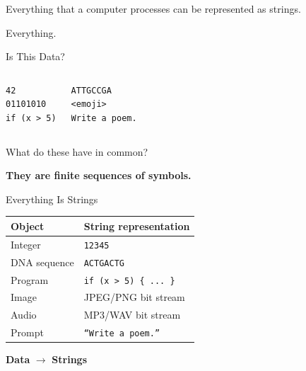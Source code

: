 \documentclass[10pt,aspectratio=169]{beamer}
\title{\CourseName}
\subtitle{\LectureTitle}
\author{Sheikh Azizul Hakim\\Lecturer, Department of CSE, BUET}
\date{Last compiled: \LastCompiledTime}
\newcommand{\keyidea}[1]{\begin{center}\alert{\textbf{#1}}\end{center}}
\begin{document}
\maketitle

\begin{frame}[standout]
Everything that a computer processes can be represented as strings.

\vspace{1em}

Everything.
\end{frame}

\begin{frame}[fragile]{Is This Data?}
\begin{columns}[T]
\begin{lstlisting}
42
01101010
if (x > 5)
\end{lstlisting}

\begin{lstlisting}
ATTGCCGA
<emoji>
Write a poem.
\end{lstlisting}
\end{columns}

\vspace{1em}

\pause
\begin{center}
What do these have in common?
\end{center}

\pause
\keyidea{They are finite sequences of symbols.}
\end{frame}

\begin{frame}{Everything Is Strings}
\begin{center}
\begin{tabular}{ll}
\toprule
\textbf{Object} & \textbf{String representation} \\
\midrule
Integer & \texttt{12345} \\
DNA sequence & \texttt{ACTGACTG} \\
Program & \texttt{if (x > 5) \{ ... \}} \\
Image & JPEG/PNG bit stream \\
Audio & MP3/WAV bit stream \\
Prompt & \texttt{``Write a poem.''} \\
\bottomrule
\end{tabular}
\end{center}

\vspace{1em}

\pause
\begin{center}
\textbf{Data} $\longrightarrow$ \textbf{Strings}
\end{center}
\end{frame}
\end{document}
